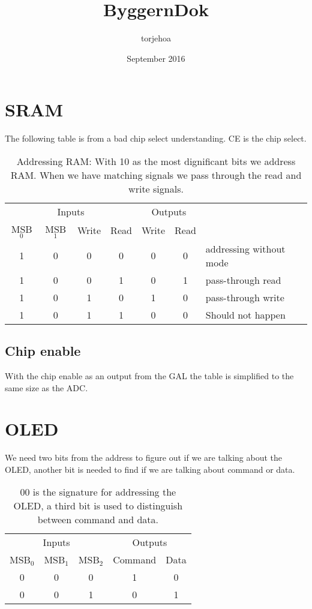 \documentclass{article}
\title{ByggernDok}
\author{torjehoa }
\date{September 2016}
\begin{document}
\maketitle

\section{SRAM}

The following table is from a bad chip select understanding. CE is the chip select. 


\begin{table}[hb]
\begin{tabular}{cccc|ccp{4cm}}
\multicolumn{4}{c}{Inputs} &\multicolumn{2}{c}{Outputs}&\\
MSB$_0$ & MSB$_1$ & Write & Read & Write & Read&\\\midrule
1 & 0 & 0 & 0 & 0 & 0 &addressing without mode\\ 
1 & 0 & 0 & 1 & 0 & 1 &pass-through read\\
1 & 0 & 1 & 0 & 1 & 0 &pass-through write\\
1 & 0 & 1 & 1 & 0 & 0 &Should not happen\\
\end{tabular}
\caption{Addressing RAM: With 10 as the most dignificant bits we address RAM. When we have matching signals we pass through the read and write signals. }
\end{table}

\subsection{Chip enable}

With the chip enable as an output from the GAL the table is simplified to the same size as the ADC. 

\clearpage

\section{OLED}
We need two bits from the address to figure out if we are talking about the OLED, another bit is needed to find if we are talking about command or data. 
\begin{table}[hb]
\begin{tabular}{ccc|cc}
\multicolumn{3}{c}{Inputs}&\multicolumn{2}{c}{Outputs}\\
MSB$_0$&MSB$_1$&MSB$_2$&Command&Data\\\midrule
0&0&0&1&0\\
0&0&1&0&1\\
\end{tabular}
\caption{00 is the signature for addressing the OLED, a third bit is used to distinguish between command and data. }
\end{table}
\end{document}
